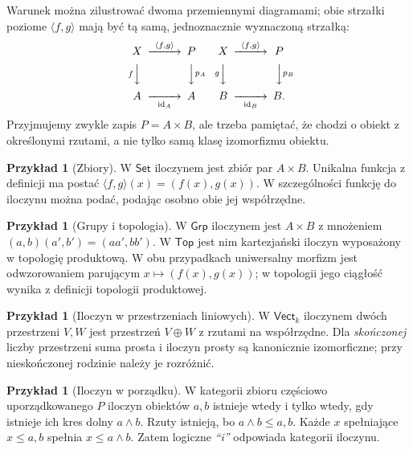 \documentclass[11pt,a4paper]{article}
\numberwithin{equation}{section}
\theoremstyle{plain}
\theoremstyle{definition}
\newtheorem{przyklad}[twierdzenie]{Przykład}
\theoremstyle{remark}
\newcommand{\cat}[1]{\mathsf{#1}}
\newcommand{\Set}{\cat{Set}}
\newcommand{\Grp}{\cat{Grp}}
\newcommand{\Top}{\cat{Top}}
\newcommand{\Vect}{\cat{Vect}}
\newcommand{\id}{\mathrm{id}}
\begin{document}
Warunek można zilustrować dwoma przemiennymi diagramami; obie strzałki poziome $\langle f,g\rangle$ mają być tą samą, jednoznacznie wyznaczoną strzałką:
\[
\begin{CD}
X @>{\langle f,g\rangle}>> P\\
@V{f}VV @VV{p_A}V\\
A @>>{\id_A}> A
\end{CD}
\qquad
\begin{CD}
X @>{\langle f,g\rangle}>> P\\
@V{g}VV @VV{p_B}V\\
B @>>{\id_B}> B.
\end{CD}
\]
Przyjmujemy zwykle zapis $P=A\times B$, ale trzeba pamiętać, że chodzi o obiekt z określonymi rzutami, a nie tylko samą klasę izomorfizmu obiektu.

\begin{przyklad}[Zbiory]
W $\Set$ iloczynem jest zbiór par $A\times B$. Unikalna funkcja z definicji ma postać $\langle f,g\rangle(x)=(f(x),g(x))$. W szczególności funkcję do iloczynu można podać, podając osobno obie jej współrzędne.
\end{przyklad}

\begin{przyklad}[Grupy i topologia]
W $\Grp$ iloczynem jest $A\times B$ z mnożeniem $(a,b)(a',b')=(aa',bb')$. W $\Top$ jest nim kartezjański iloczyn wyposażony w topologię produktową. W obu przypadkach uniwersalny morfizm jest odwzorowaniem parującym $x\mapsto(f(x),g(x))$; w topologii jego ciągłość wynika z definicji topologii produktowej.
\end{przyklad}

\begin{przyklad}[Iloczyn w przestrzeniach liniowych]
W $\Vect_k$ iloczynem dwóch przestrzeni $V,W$ jest przestrzeń $V\oplus W$ z rzutami na współrzędne. Dla \emph{skończonej} liczby przestrzeni suma prosta i iloczyn prosty są kanonicznie izomorficzne; przy nieskończonej rodzinie należy je rozróżnić.
\end{przyklad}

\begin{przyklad}[Iloczyn w porządku]
W kategorii zbioru częściowo uporządkowanego $P$ iloczyn obiektów $a,b$ istnieje wtedy i tylko wtedy, gdy istnieje ich kres dolny $a\wedge b$. Rzuty istnieją, bo $a\wedge b\leq a,b$. Każde $x$ spełniające $x\leq a,b$ spełnia $x\leq a\wedge b$. Zatem logiczne \emph{``i''} odpowiada kategorii iloczynu.
\end{przyklad}
\end{document}
